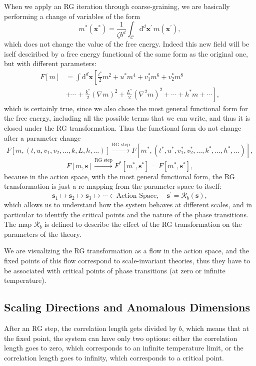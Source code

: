 When we apply an RG iteration through coarse-graining, we are basically performing a change of variables of the form
\[
    m^{*}(\mathbf{x}^{*}) = \frac{1}{\zeta b^d} \int_{\mathcal{C}} \mathrm{d}^d \mathbf{x}^{\prime} \, m(\mathbf{x}^{\prime}),
\]
which does not change the value of the free energy. Indeed this new field will be iself desciribed by a free energy functional of the same form as the original one, but with different parameters:
\[
    \begin{aligned}
        F[m] & = \int \mathrm{d}^d \mathbf{x} \left[ \frac{t^*}{2} m^2 + u^* m^4 + v^*_{1} m^6 + v^*_{2} m^8 \right.          \\
             & \left. + \cdots + \frac{k^*}{2} (\nabla m)^2 + \frac{L^*}{2} (\nabla^2 m)^2 + \cdots + h^* m + \cdots \right],
    \end{aligned}
\]
which is certainly true, since we also chose the most general functional form for the free energy, including all the possible terms that we can write, and thus it is closed under the RG transformation. Thus the functional form do not change after a parameter change
\[
    F[m, (t,u,v_1,v_2,\dots, k, L, h, \dots)] \xrightarrow{\text{RG step}} F[m^*, (t^*, u^*, v^*_{1}, v^*_{2}, \dots, k^*, \dots, h^*, \dots)],
\]
\[
    F[m, \mathbf{s}] \xrightarrow{\text{RG step}} F^*[m^*, \mathbf{s}^*] = F[m^{*}, \mathbf{s}^*],
\]
because in the action space, with the most general functional form, the RG transformation is just a re-mapping from the parameter space to itself:
\[
    \mathbf{s}_1 \mapsto \mathbf{s}_2 \mapsto \mathbf{s}_3 \mapsto \cdots \in \text{Action Space}, \quad \mathbf{s}^{\prime} = \mathcal{R}_b(\mathbf{s}),
\]
which allows us to understand how the system behaves at different scales, and in particular to identify the critical points and the nature of the phase transitions. The map \(\mathcal{R}_b\) is defined to describe the effect of the RG transformation on the parameters of the theory.

We are visualizing the RG transformation as a flow in the action space, and the fixed points of this flow correspond to scale-invariant theories, thus they have to be associated with critical points of phase transitions (at zero or infinite temperature).

\subsection{Scaling Directions and Anomalous Dimensions}

After an RG step, the correlation length gets divided by \(b\), which means that at the fixed point, the system can have only two options: either the correlation length goes to zero, which corresponds to an infinite temperature limit, or the correlation length goes to infinity, which corresponds to a critical point.

